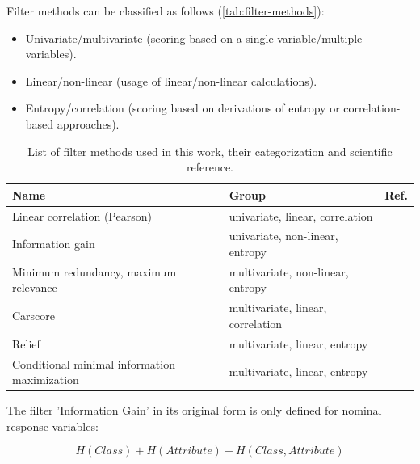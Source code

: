 \documentclass[remotesensing,article,submit,moreauthors,pdftex]{Definitions/mdpi}
\begin{document}
Filter methods can be classified as follows (\autoref{tab:filter-methods}):

\begin{itemize}
	\item Univariate/multivariate (scoring based on a single variable/multiple variables).
	\item Linear/non-linear (usage of linear/non-linear calculations).
	\item Entropy/correlation (scoring based on derivations of entropy or correlation-based approaches).
\end{itemize}

\begin{table}[b!]
	\centering
	\caption{List of filter methods used in this work, their categorization and scientific reference.}
	\label{tab:filter-methods}
	\begingroup\footnotesize
	\begin{adjustbox}{width={0.7\textwidth},totalheight={\textheight},keepaspectratio}
		\begin{tabular}{lll}
			\\
			Name                                         & Group                             & Ref.               \\
			\toprule
			Linear correlation (Pearson)                 & univariate, linear, correlation   & \cite{pearson1901} \\
			Information gain                             & univariate, non-linear, entropy   & \cite{quinlan1986} \\
			Minimum redundancy, maximum relevance        & multivariate, non-linear, entropy & \cite{zhao2013}    \\
			Carscore                                     & multivariate, linear, correlation & \cite{zuber2011}   \\
			Relief                                       & multivariate, linear, entropy     & \cite{kira1992}    \\
			Conditional minimal information maximization & multivariate, linear, entropy     & \cite{fleuret2004}
		\end{tabular}
	\end{adjustbox}
	\endgroup
\end{table}

The filter 'Information Gain' in its original form is only defined for nominal response variables:

\begin{equation}
	H(Class) + H(Attribute) - H(Class, Attribute)
\end{equation}
\end{document}
